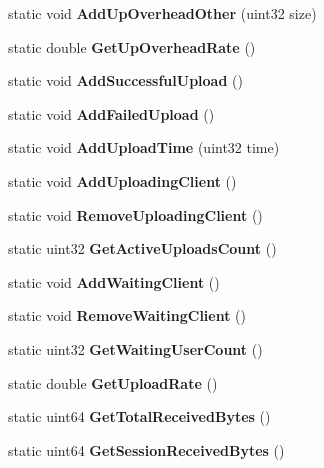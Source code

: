 \begin{DoxyCompactItemize}
\item 
static void {\bfseries AddUpOverheadOther} (uint32 size)\label{classCStatistics_a7b1473ea49db7777f03ab802d1cf5f7f}

\item 
static double {\bfseries GetUpOverheadRate} ()\label{classCStatistics_af7673a1983ebb722bedc3f87b2ef5ac8}

\item 
static void {\bfseries AddSuccessfulUpload} ()\label{classCStatistics_a86665d22831329794a4075dc01d33e39}

\item 
static void {\bfseries AddFailedUpload} ()\label{classCStatistics_ab8c82d41c57114a5cc148a6f54a11831}

\item 
static void {\bfseries AddUploadTime} (uint32 time)\label{classCStatistics_a634bac4d2a6929b97509d78f0959ed86}

\item 
static void {\bfseries AddUploadingClient} ()\label{classCStatistics_a1495850008dc66d8460f5f9fbdb5d78e}

\item 
static void {\bfseries RemoveUploadingClient} ()\label{classCStatistics_a693db25e4542dfb851f378c588c33e39}

\item 
static uint32 {\bfseries GetActiveUploadsCount} ()\label{classCStatistics_aad124ad82acbed5a56a15b6f254baf2f}

\item 
static void {\bfseries AddWaitingClient} ()\label{classCStatistics_ab8f9fe7c8c43db236f10bc747328cf01}

\item 
static void {\bfseries RemoveWaitingClient} ()\label{classCStatistics_a208c7c9642437195f72faf52e8543cf7}

\item 
static uint32 {\bfseries GetWaitingUserCount} ()\label{classCStatistics_a65c8e2af8bcbec133bfeabfa6588c840}

\item 
static double {\bfseries GetUploadRate} ()\label{classCStatistics_a3111c7270ecba71c113eabc178344ce4}

\item 
static uint64 {\bfseries GetTotalReceivedBytes} ()\label{classCStatistics_a7259ef93b357ca4de4e3c906bc0ae765}

\item 
static uint64 {\bfseries GetSessionReceivedBytes} ()\label{classCStatistics_aac8858c0b6d19fe7f4ad0ecae202f5a4}


\end{DoxyCompactItemize}
